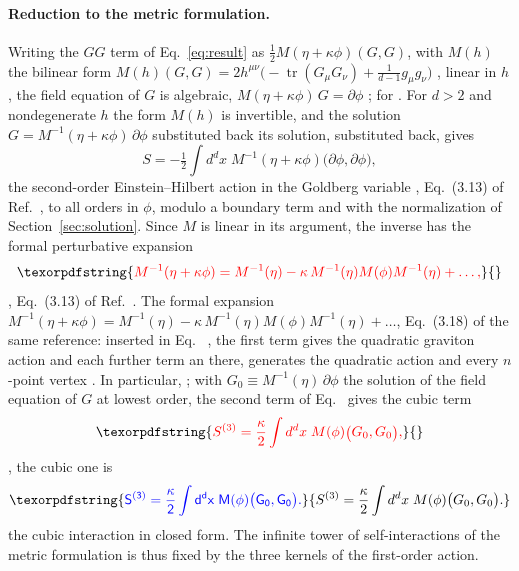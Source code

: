 \documentclass[prd,aps,preprint,superscriptaddress,nofootinbib,amsmath,amssymb,eqsecnum]{revtex4-2}
\providecommand{\DIFaddtex}[1]{{\protect\color{blue} \sf #1}} %
\providecommand{\DIFdeltex}[1]{{\protect\color{red} \scriptsize #1}} %
\providecommand{\DIFaddbegin}{} %
\providecommand{\DIFaddend}{} %
\providecommand{\DIFdelbegin}{} %
\providecommand{\DIFdelend}{} %
\providecommand{\DIFadd}[1]{\texorpdfstring{\DIFaddtex{#1}}{#1}} %
\providecommand{\DIFdel}[1]{\texorpdfstring{\DIFdeltex{#1}}{}} %
\begin{document}
\DIFdelend \paragraph{Reduction to the metric formulation.} Writing the $GG$ term of Eq.~\eqref{eq:result}
as $\tfrac12 M(\eta+\kappa\phi)(G,G)$, with
\DIFdelbegin \DIFdel{$M(h)$ the bilinear form
}\DIFdelend $M(h)(G,G)=2h^{\mu\nu}\big(-\operatorname{tr}(G_\mu G_\nu)+\tfrac{1}{d-1}g_\mu g_\nu\big)$
\DIFdelbegin \DIFdel{, }\DIFdelend linear in $h$, the field equation of $G$ is algebraic, $M(\eta+\kappa\phi)\,G=\partial\phi$\DIFdelbegin \DIFdel{; for
}\DIFdelend \DIFaddbegin \DIFadd{.
For }\DIFaddend $d>2$ and nondegenerate $h$ \DIFdelbegin \DIFdel{the form $M(h)$ is invertible, and the solution$G=M^{-1}(\eta+\kappa\phi)\,\partial\phi$ substituted back}\DIFdelend \DIFaddbegin \DIFadd{its solution, substituted back, }\DIFaddend gives
\begin{equation}
S=-\tfrac12\int d^dx\;M^{-1}(\eta+\kappa\phi)\big(\partial\phi,\partial\phi\big),
\label{eq:second}
\end{equation}
the second-order Einstein--Hilbert action in the Goldberg variable \DIFdelbegin \DIFdel{, Eq.~(3.13) of
Ref.~\cite{BrandtMcKeon2016}, }\DIFdelend to all orders in $\phi$,
modulo a boundary term\DIFdelbegin \DIFdel{and with the
normalization of Section~\ref{sec:solution}. Since $M$ is linear in its argument,
the inverse has the formal perturbative expansion
}\begin{displaymath}
\DIFdel{M^{-1}(\eta+\kappa\phi)=M^{-1}(\eta)-\kappa\,M^{-1}(\eta)M(\phi)M^{-1}(\eta)+\dots,
}\end{displaymath}%
\DIFdelend \DIFaddbegin \DIFadd{, Eq.~(3.13) of Ref.~\cite{BrandtMcKeon2016}. The formal expansion
$M^{-1}(\eta+\kappa\phi)=M^{-1}(\eta)-\kappa\,M^{-1}(\eta)M(\phi)M^{-1}(\eta)+\dots$,
}\DIFaddend Eq.~(3.18) \DIFdelbegin \DIFdel{of the same reference: inserted in Eq.~}%
\DIFdel{, the first term gives
the quadratic graviton action and each further term an }\DIFdelend \DIFaddbegin \DIFadd{there, generates the quadratic action and every }\DIFaddend $n$-point vertex\DIFdelbegin \DIFdel{. In particular,
}\DIFdelend \DIFaddbegin \DIFadd{; }\DIFaddend with
$G_0\equiv M^{-1}(\eta)\,\partial\phi$\DIFdelbegin \DIFdel{the solution of the field equation of $G$ at
lowest order, the second term of Eq.~}%
\DIFdel{gives the cubic term
}\begin{displaymath}
\DIFdel{S^{(3)}=\frac{\kappa}{2}\int d^dx\;M(\phi)\big(G_0,G_0\big),
}\end{displaymath}%
\DIFdelend \DIFaddbegin \DIFadd{, the cubic one is
}\begin{equation}
\DIFadd{S^{(3)}=\frac{\kappa}{2}\int d^dx\;M(\phi)\big(G_0,G_0\big).
\label{eq:cubicvertex}
}\end{equation}\DIFaddend 
\DIFdelbegin \DIFdel{the cubic interaction in closed form. The infinite tower of self-interactions of the metric formulation is
thus fixed by the three kernels of the first-order action.
}\DIFdelend 
\end{document}
